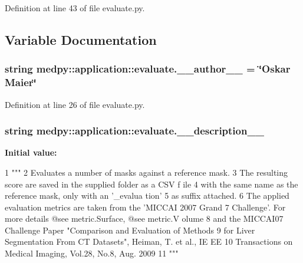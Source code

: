 Definition at line 43 of file evaluate.py.



\subsection{Variable Documentation}
\hypertarget{namespacemedpy_1_1application_1_1evaluate_aa59acc24b7bdfef4901f1cffefd8fa75}{
\subsubsection[{\_\-\_\-author\_\-\_\-}]{\setlength{\rightskip}{0pt plus 5cm}string {\bf medpy::application::evaluate.\_\-\_\-author\_\-\_\-} = \char`\"{}Oskar Maier\char`\"{}}}
\label{namespacemedpy_1_1application_1_1evaluate_aa59acc24b7bdfef4901f1cffefd8fa75}


Definition at line 26 of file evaluate.py.

\hypertarget{namespacemedpy_1_1application_1_1evaluate_a35ca6226db281f3fb2df3e3cde77f6d4}{
\subsubsection[{\_\-\_\-description\_\-\_\-}]{\setlength{\rightskip}{0pt plus 5cm}string {\bf medpy::application::evaluate.\_\-\_\-description\_\-\_\-}}}
\label{namespacemedpy_1_1application_1_1evaluate_a35ca6226db281f3fb2df3e3cde77f6d4}
{\bfseries Initial value:}
\begin{DoxyCode}
1 """
2                   Evaluates a number of masks against a reference mask.
3                   The resulting score are saved in the supplied folder as a CSV f
      ile
4                   with the same name as the reference mask, only with an '_evalua
      tion'
5                   as suffix attached.
6                   The applied evaluation metrics are taken from the 'MICCAI 2007 
      Grand
7                   Challenge'. For more details @see metric.Surface, @see metric.V
      olume
8                   and the MICCAI07 Challenge Paper "Comparison and Evaluation of 
      Methods
9                   for Liver Segmentation From CT Datasets", Heiman, T. et al., IE
      EE
10                   Transactions on Medical Imaging, Vol.28, No.8, Aug. 2009
11                   """
\end{DoxyCode}


